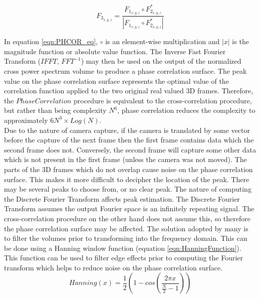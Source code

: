 \begin{equation} \label{eqn:PHCOR_eq}
F_{3_{x,y,z}} = \frac{F_{1_{x,y,z}} \circ F_{2_{x,y,z}}^*}{ | F_{1_{x,y,z}} \circ F_{2_{x,y,z}}^* | }
\end{equation}

In equation \ref{eqn:PHCOR_eq}, $\circ$ is an element-wise multiplication and $|x|$ is the magnitude function or absolute value function. The Inverse Fast Fourier Transform ($IFFT$, $FFT^{-1}$) may then be used on the output of the normalized cross power spectrum volume to produce a phase correlation surface. The peak value on the phase correlation surface represents the optimal value of the correlation function applied to the two original real valued 3D frames. Therefore, the $PhaseCorrelation$ procedure is equivalent to the cross-correlation procedure, but rather than being complexity $N^6$, phase correlation reduces the complexity to approximately $6N^3 \times Log(N)$. \\


Due to the nature of camera capture, if the camera is translated by some vector before the capture of the next frame then the first frame contains data which the second frame does not. Conversely, the second frame will capture some other data which is not present in the first frame (unless the camera was not moved). The parts of the 3D frames which do not overlap cause noise on the phase correlation surface. This makes it more difficult to decipher the location of the peak. There may be several peaks to choose from, or no clear peak. The nature of computing the Discrete Fourier Transform affects peak estimation. The Discrete Fourier Transform assumes the output Fourier space is an infinitely repeating signal. The cross-correlation procedure on the other hand does not assume this, so therefore the phase correlation surface may be affected. The solution adopted by many is to filter the volumes prior to transforming into the frequency domain. This can be done using a Hanning window function (equation \ref{eqn:HanningFunction}). This function can be used to filter edge effects prior to computing the Fourier transform which helps to reduce noise on the phase correlation surface. \\

\begin{equation} \label{eqn:HanningFunction}
Hanning(x) = \frac{1}{2}\left(1 - cos\left(\frac{2\pi x}{\frac{N}{2} - 1}\right)\right)
\end{equation}

